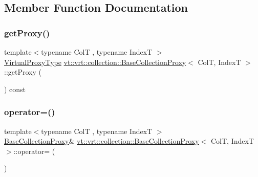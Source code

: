 \subsection{Member Function Documentation}
\mbox{\label{structvt_1_1vrt_1_1collection_1_1_base_collection_proxy_aca7569f3f6cba2bae0103da7bf3b2742}} 
\subsubsection{\texorpdfstring{get\+Proxy()}{getProxy()}}
{\footnotesize\ttfamily template$<$typename ColT , typename IndexT $>$ \\
\hyperlink{namespacevt_a1b417dd5d684f045bb58a0ede70045ac}{Virtual\+Proxy\+Type} \hyperlink{structvt_1_1vrt_1_1collection_1_1_base_collection_proxy}{vt\+::vrt\+::collection\+::\+Base\+Collection\+Proxy}$<$ ColT, IndexT $>$\+::get\+Proxy (\begin{DoxyParamCaption}{ }\end{DoxyParamCaption}) const}

\mbox{\label{structvt_1_1vrt_1_1collection_1_1_base_collection_proxy_a1cdcceecdc695e35caaeb6298fb6a0bf}} 
\subsubsection{\texorpdfstring{operator=()}{operator=()}}
{\footnotesize\ttfamily template$<$typename ColT , typename IndexT $>$ \\
\hyperlink{structvt_1_1vrt_1_1collection_1_1_base_collection_proxy}{Base\+Collection\+Proxy}\& \hyperlink{structvt_1_1vrt_1_1collection_1_1_base_collection_proxy}{vt\+::vrt\+::collection\+::\+Base\+Collection\+Proxy}$<$ ColT, IndexT $>$\+::operator= (\begin{DoxyParamCaption}\item[{\hyperlink{structvt_1_1vrt_1_1collection_1_1_base_collection_proxy}{Base\+Collection\+Proxy}$<$ ColT, IndexT $>$ const \&}]{ }\end{DoxyParamCaption})\hspace{0.3cm}{\ttfamily [default]}}

